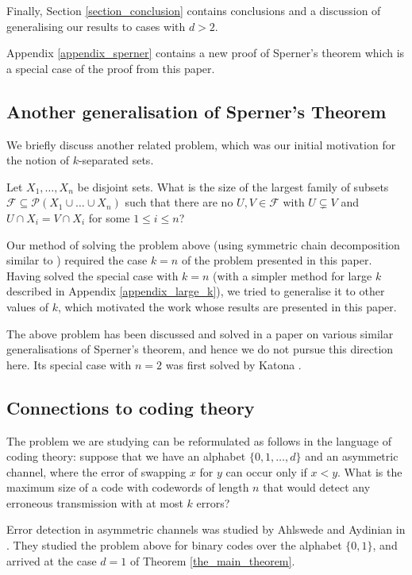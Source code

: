 \documentclass[11pt, reqno]{amsart}
\theoremstyle{remark}
\numberwithin{equation}{section}
\begin{document}
Finally, Section \ref{section_conclusion} contains conclusions and a discussion of generalising our results to cases with $d>2$.

Appendix \ref{appendix_sperner} contains a new proof of Sperner's theorem which is a special case of the proof from this paper.

\subsection{Another generalisation of Sperner's Theorem}

We briefly discuss another related problem, which was our initial motivation for the notion of $k$-separated sets.

Let $X_1, \ldots, X_n$ be disjoint sets. What is the size of the largest family of subsets $\mathcal{F} \subseteq \mathcal{P}(X_1 \cup \ldots \cup X_n)$ such that there are no $U, V \in \mathcal{F}$ with $U \subsetneq V$ and $U \cap X_i = V \cap X_i$ for some $1 \leqslant i \leqslant n$?

Our method of solving the problem above (using symmetric chain decomposition similar to \cite{symmetric_chain_decomposition}) required the case $k=n$ of the problem presented in this paper. Having solved the special case with $k=n$ (with a simpler method for large $k$ described in Appendix \ref{appendix_large_k}), we tried to generalise it to other values of $k$, which motivated the work whose results are presented in this paper.

The above problem has been discussed and solved in a paper \cite[Theorem 5.1]{tour_m_part_p_sperner_families} on various similar generalisations of Sperner's theorem, and hence we do not pursue this direction here. Its special case with $n=2$ was first solved by Katona \cite{katona_n2}.

\subsection{Connections to coding theory}

The problem we are studying can be reformulated as follows in the language of coding theory: suppose that we have an alphabet $\{0, 1, \dots, d\}$ and an asymmetric channel, where the error of swapping $x$ for $y$ can occur only if $x<y$. What is the maximum size of a code with codewords of length $n$ that would detect any erroneous transmission with at most $k$ errors?

Error detection in asymmetric channels was studied by Ahlswede and Aydinian in \cite{asymmetric_channels}. They studied the problem above for binary codes over the alphabet $\{0, 1\}$, and arrived at the case $d=1$ of Theorem \ref{the_main_theorem}.
\end{document}
